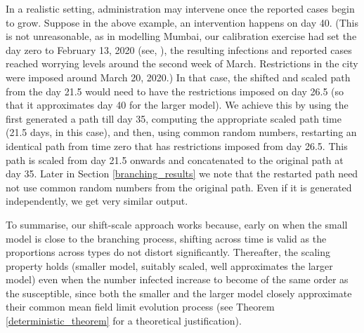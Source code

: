 \documentclass{article}
\theoremstyle{definition}
\begin{document}
In a realistic setting, administration may intervene once the reported cases begin to grow. Suppose in the above example, an
intervention happens on day 40.  (This is not unreasonable, as in modelling Mumbai, 
our calibration exercise had set the day zero to February 13, 2020 (see, \cite{October_report_2020}), the resulting infections and  reported cases reached worrying levels 
around the second week of March. Restrictions in the city were  imposed around March 20, 2020.)
In that case, the shifted and scaled path from the day 21.5 would need to have the restrictions imposed on day 26.5 (so that it approximates day 40 
for the larger model). We achieve this by using the first generated a path till day 35, computing the appropriate scaled path time (21.5 days, in this case),
 and then, using common random numbers, restarting an identical path from time zero that has restrictions imposed from day 26.5. This path is scaled from day 21.5 onwards and concatenated to the original path at day 35. 
 Later in Section \ref{branching_results} we note that the restarted path need not use common random numbers from the original path. Even if it is generated independently, we get very similar output.
 
To summarise, our shift-scale approach works because, early on when the small model is close to the branching process, shifting across time is valid
as the proportions across types do not distort significantly. Thereafter, the scaling property holds (smaller model, suitably scaled, well approximates the larger model)
even when the number infected increase to become of the same order as the susceptible, since both the smaller and the larger model closely approximate 
their common mean field limit evolution process (see Theorem \ref{deterministic_theorem} for a theoretical justification). 
 
 
 
 


 
\end{document}
